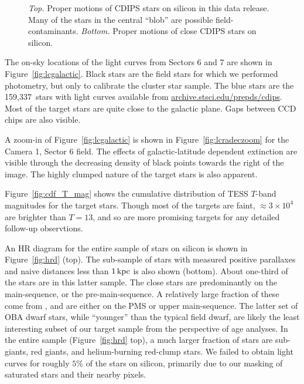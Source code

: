 \documentclass[12pt,twocolumn,tighten]{aastex62}
\newcommand{\numberlcs}{159{,}337\ } %
\newcommand{\stscilink} {\url{archive.stsci.edu/prepds/cdips}}
\begin{document}
\begin{figure}[!t]
	\vspace{-0.8cm}
	\vspace{-0.8cm}
	\caption{
    {\it Top.} Proper motions of CDIPS stars on silicon in this
    data release.  Many of the stars in the central ``blob'' are possible
    field-contaminants.
    {\it Bottom.} Proper motions of close CDIPS stars
    on silicon.
	}
	\label{fig:propermotions}
\end{figure}

The on-sky locations of the light curves from Sectors 6 and 7
are shown in Figure~\ref{fig:lcgalactic}.
Black stars are the field stars for which we performed photometry,
but only to calibrate the cluster star sample.
The blue stars are the \numberlcs stars with light curves available
from \stscilink.
Most of the target stars are quite close to the galactic plane.
Gaps between CCD chips are also visible.

A zoom-in of Figure~\ref{fig:lcgalactic} is shown in Figure~\ref{fig:lcradeczoom}
for the Camera 1, Sector 6 field. The effects of galactic-latitude
dependent extinction are visible through the decreasing density of black
points towards the right of the image.
The highly clumped nature of the target stars is also apparent.

Figure~\ref{fig:cdf_T_mag} shows the cumulative distribution of
TESS $T$-band magnitudes for the target stars.
Though most of the targets are faint, $\approx3\times10^4$ are
brighter than $T=13$, and so are more promising targets for any
detailed follow-up observtions.

An HR diagram for the entire sample of stars on silicon
is shown in Figure~\ref{fig:hrd} (top).
The sub-sample of stars with
measured positive parallaxes and naive distances less than
$1\,{\rm kpc}$ is also shown (bottom).
About one-third of the stars are in this latter sample.
The close stars are predominantly on the main-sequence, or the pre-main-sequence.
A relatively large fraction of these come from \citet{zari_3d_2018},
and are either on the PMS or upper main-sequence.
The latter set of OBA dwarf stars, while ``younger'' than the typical
field dwarf, are likely the least interesting subset of our target sample
from the perspective of age analyses.
In the entire sample (Figure~\ref{fig:hrd} top), a much larger fraction of stars are sub-giants,
red giants, and helium-burning red-clump stars.
We failed to obtain light curves for roughly $5\%$ of the stars on silicon, 
primarily due to our masking of saturated stars and their nearby pixels.
\end{document}
